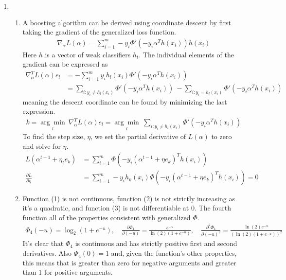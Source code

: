 \documentclass[11pt,letter]{article}
\begin{document}
\begin{enumerate}
\item \begin{enumerate}
    \item A boosting algorithm can be derived using coordinate descent by first taking the gradient of the generalized loss function.
    \begin{align*}
        \nabla_\alpha L(\alpha) = \sum_{i=1}^m -y_i \Phi'(-y_i\alpha^T h(x_i)) h(x_i)
    \end{align*}
    Here $h$ is a vector of weak classifiers $h_t$.
    The individual elements of the gradient can be expressed as
    \begin{align*}
        \nabla_\alpha^T L(\alpha) e_l & = -\sum_{i=1}^m y_i h_l(x_i) \Phi'(-y_i\alpha^Th(x_i)) \\
        & = \sum_{i:y_i \neq h_l(x_i)} \Phi'(-y_i\alpha^Th(x_i)) \ - \sum_{i:y_i = h_l(x_i)} \Phi'(-y_i\alpha^Th(x_i))
    \end{align*}
    meaning the descent coordinate can be found by minimizing the last expression.
    \begin{align*}
        k = \underset{l}{\arg \min} \ \nabla_\alpha^T L(\alpha) e_l = \underset{l}{\arg \min} \ \sum_{i:y_i \neq h_l(x_i)} \Phi'(-y_i\alpha^Th(x_i))
    \end{align*}
    To find the step size, $\eta$, we set the partial derivative of $L(\alpha)$ to zero and solve for $\eta$.
    \begin{align*}
        L(\alpha^{t-1} + \eta_te_k) & = \sum_{i=1}^m \Phi(-y_i(\alpha^{t-1} + \eta e_k)^T h (x_i)) \\
        \frac{\partial L}{\partial \eta} & = \sum_{i=1}^m -y_ih_k(x_i)\Phi(-y_i(\alpha^{t-1} + \eta e_k)^T h (x_i)) = 0
    \end{align*}
    \item Function (1) is not continuous, function (2) is not strictly increasing as it's a quadratic, and function (3) is not differentiable at 0.
    The fourth function all of the properties consistent with generalized $\Phi$.
    \begin{align*}
        \Phi_4(-u) = \log_2(1 + e^{-u}), \quad \frac{\partial \Phi_4}{\partial(-u)} = \frac{e^{-u}}{\ln (2) (1+e^{-u})}, \quad \frac{\partial^2 \Phi_4}{\partial(-u)^2} = \frac{\ln(2)e^{-u}}{(\ln(2)(1+e^{-u}))^2}
    \end{align*}
    It's clear that $\Phi_4$ is continuous and has strictly positive first and second derivatives.
    Also $\Phi_4(0) = 1$ and, given the function's other properties, this means that is  greater than zero for negative arguments and greater than 1 for positive arguments.

\end{enumerate}
\end{enumerate}
\end{document}
